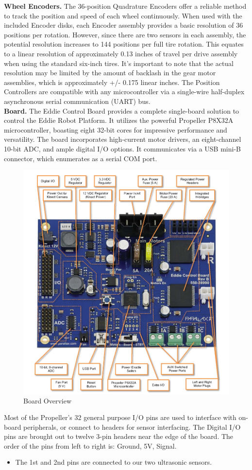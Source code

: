 \textbf{Wheel Encoders.} The 36-position Quadrature Encoders offer a reliable method to track the position and speed of each wheel continuously. When used with the included Encoder disks, each Encoder assembly provides a basic resolution of 36 positions per rotation. However, since there are two sensors in each assembly, the potential resolution increases to 144 positions per full tire rotation. This equates to a linear resolution of approximately 0.13 inches of travel per drive assembly when using the standard six-inch tires. It's important to note that the actual resolution may be limited by the amount of backlash in the gear motor assemblies, which is approximately +/- 0.175 linear inches.
The Position Controllers are compatible with any microcontroller via a single-wire half-duplex asynchronous serial communication (UART) bus.\\

\textbf{Board.} The Eddie Control Board provides a complete single-board solution to control the Eddie Robot Platform. It utilizes the powerful Propeller P8X32A microcontroller, boasting eight 32-bit cores for impressive performance and versatility. The board incorporates high-current motor drivers, an eight-channel 10-bit ADC, and ample digital I/O options. It communicates via a USB mini-B connector, which enumerates as a serial COM port.\\
\begin{figure}[H]
	\centering
	\includegraphics[width=0.8\linewidth]{figures/board-overview.png}
	\caption{Board Overview}
	\label{fig:boardOverview}
\end{figure}
Most of the Propeller’s 32 general purpose I/O pins are used to interface with on-board peripherals, or connect to headers for sensor interfacing. The Digital I/O pins are brought out to twelve 3-pin headers near the edge of the board. The order of the pins from left to right is: Ground, 5V, Signal. 
\begin{itemize}
    \item The 1st and 2nd pins are connected to our two ultrasonic sensors.
\end{itemize}
    
